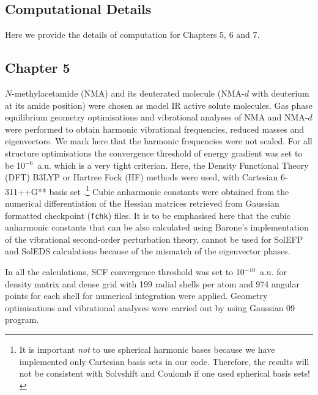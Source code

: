 \documentclass[b5paper,oneside,fleqn,11pt]{book}
\begin{document}
\begin{appendices}
\begin{refsection}
\chapter{Computational Details\label{a:computational-details}}

Here we provide the details of computation for Chapters 5, 6 and 7.

\section{Chapter 5}

$N$-methylacetamide (NMA) and its deuterated molecule
(NMA-$d$ with deuterium at its amide position) 
were chosen as model IR active solute molecules. 
Gas phase equilibrium
geometry optimisations and vibrational analyses of NMA
and NMA-$d$ were performed
to obtain harmonic vibrational frequencies, reduced
masses and eigenvectors.
We mark here that the harmonic frequencies were not scaled. 
For all structure optimisations the convergence
threshold of energy gradient was set to be 10$^{-6}$~a.u.
which is a very tight criterion.
Here, the Density Functional Theory (DFT) B3LYP \citep{Becke.JCP.1993,
Lee.Yang.Parr.PhysRevB.1988,Vosko.Wilk.Nusair.CJP.1980,
Stephens.Devlin.Chabalowski.Frisch.JPC.1994}
%
or Hartree Fock \citep{Roothaan.RevModPhys.1951} (HF) methods were used,
with Cartesian 6-311++G** 
basis set \citep{Krishnan.Binkley.Seeger.Pople.JCP.1980,
McLean.Chandler.JCP.1980}.\footnote{It is 
important \emph{not} to use spherical harmonic bases
because we have implemented only Cartesian basis sets 
in our code. Therefore, the results will not be consistent
with {\sc Solvshift} and {\sc Coulomb} if one used spherical basis sets!} 
Cubic anharmonic constants were obtained from the numerical
differentiation of the Hessian matrices retrieved from Gaussian
formatted checkpoint ({\tt fchk}) files.
It is to be emphasised here that the cubic anharmonic constants
that can be also calculated using Barone's implementation \citep{Barone.JCP.2005} 
of
the vibrational second\hyp{}order perturbation theory,
cannot be used for SolEFP and SolEDS calculations because of the mismatch of the eigenvector
phases.

In all the calculations, SCF convergence threshold
was set to 10$^{-10}$~a.u. for density matrix and dense grid with
199 radial shells per atom and 974 angular points for each
shell for numerical integration were 
applied. \citep{Lebedev.Skorokhodov.RussAcadSciDoklMAth.1992}
Geometry optimisations and vibrational analyses were carried out
by using {\sc Gaussian 09} program. \citep{Frisch.Gaussian.2009}


\end{refsection}
\end{appendices}
\end{document}

